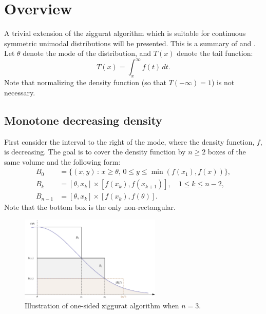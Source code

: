 \documentclass{article}
\theoremstyle{definition} %
\newcommand{\Mode}{\theta}
\begin{document}
\section{Overview}

    A trivial extension of the ziggurat algorithm which is suitable for continuous symmetric unimodal distributions will be presented. This is a summary of \citet{Marsaglia+Tsang} and \citet{Doornik:05}.
    Let $\Mode $ denote the mode of the distribution, and $T(x)$ denote the tail function:
    \[
        T(x) = \int _x ^{\infty} f(t) \,dt.
    \]
    Note that normalizing the density function (so that $T(-\infty ) = 1$) is not necessary.

\subsection{Monotone decreasing density}

    First consider the interval to the right of the mode, where the density function, $f$, is decreasing.
    The goal is to cover the density function by $n \ge 2$ boxes of the same volume and the following form:
    \begin{align*}
        B_0 &= \{ (x, y) \,:\, x \ge \Mode , \, 0 \le y \le \min (f(x_1), f(x)) \}, \\
        B_k &= [\Mode , x_k] \times [f(x_k), f(x_{k + 1})], \quad 1 \le k \le n - 2, \\
        B_{n - 1} &= [\Mode , x_k] \times [f(x_k), f(\Mode )].
    \end{align*}
    Note that the bottom box is the only non-rectangular.
    \begin{figure}[!htb]
        \centering
        \includegraphics[width=0.6\textwidth]{ziggurat_normal_3.eps}
        \caption{Illustration of one-sided ziggurat algorithm when $n = 3$.}
        \label{fig:ziggurat_normal_3}
    \end{figure}
\end{document}
